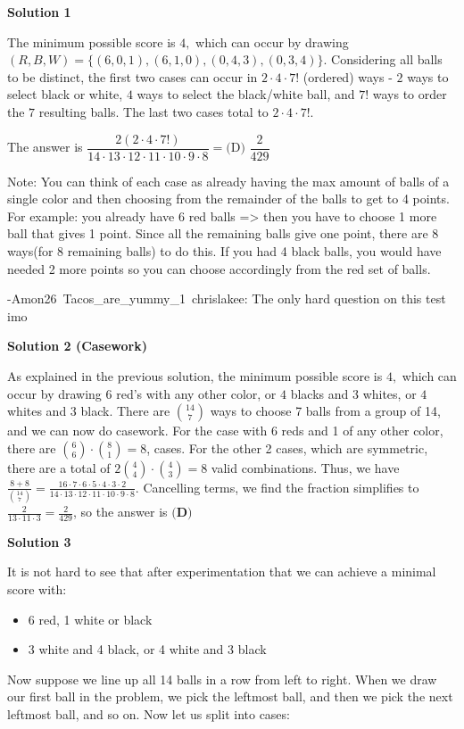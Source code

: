 \begin{enumerate}
\textbf{Solution 1}

The minimum possible score is $4,$ which can occur by drawing $(R,B,W)=\{(6,0,1),(6,1,0),(0,4,3),(0,3,4)\}.$ Considering all balls to be distinct, the first two cases can occur in $2\cdot4\cdot7!$ (ordered) ways - $2$ ways to select black or white, $4$ ways to select the black/white ball, and $7!$ ways to order the $7$ resulting balls. The last two cases total to $2\cdot4\cdot7!.$

 The answer is $\dfrac{2(2\cdot4\cdot7!)}{14\cdot13\cdot12\cdot11\cdot10\cdot9\cdot8}=\boxed{\text{(D) }\dfrac{2}{429}}$ 

 Note: You can think of each case as already having the max amount of balls of a single color and then choosing from the remainder of the balls to get to 4 points. For example: you already have 6 red balls => then you have to choose 1 more ball that gives 1 point. Since all the remaining balls give one point, there are 8 ways(for 8 remaining balls) to do this. If you had 4 black balls, you would have needed 2 more points so you can choose accordingly from the red set of balls.

 -Amon26~Tacos\_are\_yummy\_1~chrislakee: The only hard question on this test imo

 



\textbf{Solution 2 (Casework)}

As explained in the previous solution, the minimum possible score is $4,$ which can occur by drawing $6$ red's with any other color, or $4$ blacks and $3$ whites, or $4$ whites and $3$ black. There are $\binom{14}{7}$ ways to choose 7 balls from a group of 14, and we can now do casework. For the case with 6 reds and 1 of any other color, there are $\binom{6}{6}\cdot \binom{8}{1}=8$, cases. For the other 2 cases, which are symmetric, there are a total of $2\binom{4}{4}\cdot \binom{4}{3}=8$ valid combinations. Thus, we have $\frac{8+8}{\binom{14}{7}}=\frac{16\cdot 7\cdot 6\cdot 5\cdot 4\cdot 3\cdot 2}{14\cdot 13\cdot 12\cdot 11\cdot 10\cdot 9\cdot 8}$. Cancelling terms, we find the fraction simplifies to $\frac{2}{13\cdot 11\cdot 3}=\frac{2}{429}$, so the answer is $\boxed{\textbf{(D)}}$




\textbf{Solution 3}

It is not hard to see that after experimentation that we can achieve a minimal score with:

 
            \begin{itemize}
        \item 6 red, 1 white or black
        \item 3 white and 4 black, or 4 white and 3 black
            \end{itemize}
            Now suppose we line up all 14 balls in a row from left to right. When we draw our first ball in the problem, we pick the leftmost ball, and then we pick the next leftmost ball, and so on. Now let us split into cases:


\end{enumerate}
